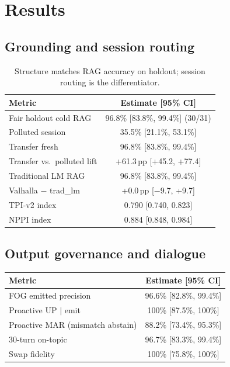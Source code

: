 \documentclass[11pt,a4paper]{article}
\begin{document}
\section{Results}

\subsection{Grounding and session routing}

\begin{table}[h]
\centering
\begin{tabular}{lc}
\toprule
Metric & Estimate [95\% CI] \\
\midrule
Fair holdout cold RAG & 96.8\% [83.8\%, 99.4\%] (30/31) \\
Polluted session & 35.5\% [21.1\%, 53.1\%] \\
Transfer fresh & 96.8\% [83.8\%, 99.4\%] \\
Transfer vs.\ polluted lift & +61.3\,pp [+45.2, +77.4] \\
Traditional LM RAG & 96.8\% [83.8\%, 99.4\%] \\
Valhalla $-$ trad\_lm & +0.0\,pp [$-$9.7, +9.7] \\
TPI-v2 index & 0.790 [0.740, 0.823] \\
NPPI index & 0.884 [0.848, 0.984] \\
\bottomrule
\end{tabular}
\caption{Structure matches RAG accuracy on holdout; session routing is the differentiator.}
\end{table}

\subsection{Output governance and dialogue}

\begin{table}[h]
\centering
\begin{tabular}{lc}
\toprule
Metric & Estimate [95\% CI] \\
\midrule
FOG emitted precision & 96.6\% [82.8\%, 99.4\%] \\
Proactive UP $|$ emit & 100\% [87.5\%, 100\%] \\
Proactive MAR (mismatch abstain) & 88.2\% [73.4\%, 95.3\%] \\
30-turn on-topic & 96.7\% [83.3\%, 99.4\%] \\
Swap fidelity & 100\% [75.8\%, 100\%] \\
\bottomrule
\end{tabular}
\end{table}
\end{document}
